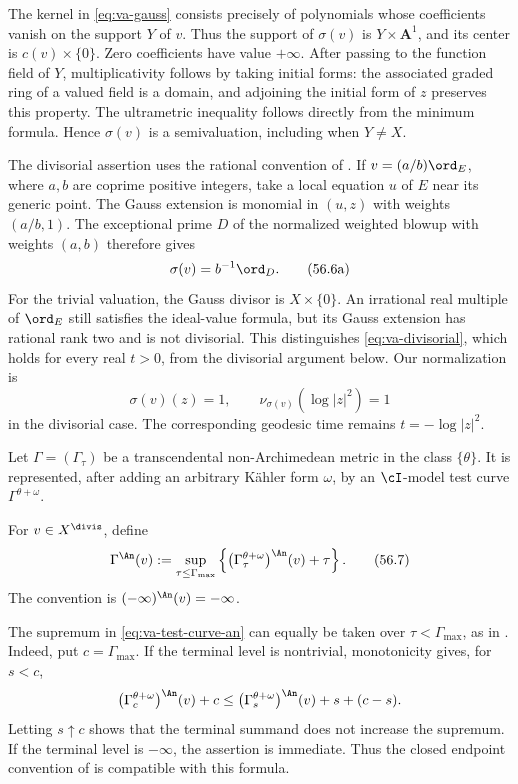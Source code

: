 The kernel in \eqref{eq:va-gauss} consists precisely of polynomials
whose coefficients vanish on the support $Y$ of $v$. Thus the support
of $\sigma(v)$ is $Y\times\mathbf A^1$, and its center is
$c(v)\times\{0\}$. Zero coefficients have value $+\infty$.
After passing to the function field of $Y$, multiplicativity follows
by taking initial forms: the associated graded ring of a valued field
is a domain, and adjoining the initial form of $z$ preserves this
property. The ultrametric inequality follows directly from the minimum
formula. Hence $\sigma(v)$ is a semivaluation, including when $Y\ne X$.

The divisorial assertion uses the rational convention of
. If $v=(a/b)\ord_E$, where $a,b$ are coprime
positive integers, take a local equation $u$ of $E$ near its generic
point. The Gauss extension is monomial in $(u,z)$ with weights
$(a/b,1)$. The exceptional prime $D$ of the normalized weighted blowup
with weights $(a,b)$ therefore gives
\[
                   \sigma(v)=b^{-1}\ord_D.
\tag{56.6a}\label{eq:va-gauss-weighted-divisor}
\]
For the trivial valuation, the Gauss divisor is $X\times\{0\}$.
An irrational real multiple of $\ord_E$ still satisfies the ideal-value
formula, but its Gauss extension has rational rank two and is not
divisorial. This distinguishes \eqref{eq:va-divisorial}, which holds
for every real $t>0$, from the divisorial argument below.
Our normalization is
\[
                         \sigma(v)(z)=1,
 \qquad \nu_{\sigma(v)}(\log|z|^2)=1
\]
in the divisorial case. The corresponding geodesic time remains
$t=-\log|z|^2$.

Let $\Gamma=(\Gamma_\tau)$ be a transcendental non-Archimedean metric in
the class $\{\theta\}$.
It is represented, after adding an arbitrary K\"ahler form $\omega$, by an
$\cI$-model test curve
$\Gamma^{\theta+\omega}$.

\begin{definition}
\label{def:va-test-curve-analytification}
For $v\in X^{\divis}$, define
\[
 \Gamma^{\An}(v)
 :=\sup_{\tau\leq\Gamma_{\max}}
       \left\{
       \bigl(\Gamma_\tau^{\theta+\omega}\bigr)^{\An}(v)+\tau
       \right\}.
\tag{56.7}\label{eq:va-test-curve-an}
\]
The convention is
$(-\infty)^{\An}(v)=-\infty$.
\end{definition}

The supremum in \eqref{eq:va-test-curve-an} can equally be taken over
$\tau<\Gamma_{\max}$, as in \cite[after (17)]{DXZ23}.
Indeed, put $c=\Gamma_{\max}$. If the terminal level is nontrivial,
monotonicity gives, for $s<c$,
\[
 \bigl(\Gamma_c^{\theta+\omega}\bigr)^{\An}(v)+c
 \leq\bigl(\Gamma_s^{\theta+\omega}\bigr)^{\An}(v)+s+(c-s).
\]
Letting $s\uparrow c$ shows that the terminal summand does not increase
the supremum. If the terminal level is $-\infty$, the assertion is
immediate. Thus the closed endpoint convention of
 is compatible with this formula.

